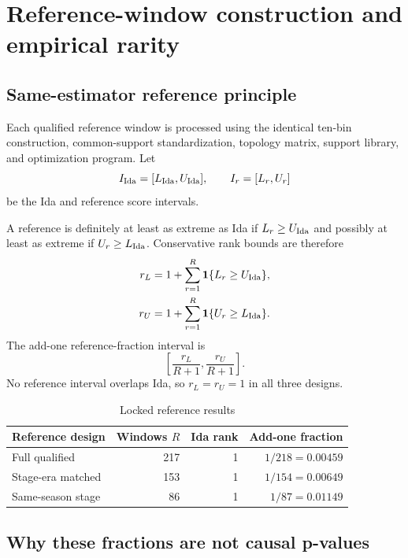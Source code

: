 \documentclass[11pt]{article}
\begin{document}
\section{Reference-window construction and empirical rarity}
\label{sec:reference}

\subsection{Same-estimator reference principle}

Each qualified reference window is processed using the identical ten-bin construction, common-support standardization, topology matrix, support library, and optimization program. Let
\begin{equation}
I_{\mathrm{Ida}}=[L_{\mathrm{Ida}},U_{\mathrm{Ida}}],
\qquad
I_r=[L_r,U_r]
\end{equation}
be the Ida and reference score intervals.

A reference is definitely at least as extreme as Ida if $L_r\ge U_{\mathrm{Ida}}$ and possibly at least as extreme if $U_r\ge L_{\mathrm{Ida}}$. Conservative rank bounds are therefore
\begin{align}
r_L&=1+\sum_{r=1}^{R}\mathbf{1}\{L_r\ge U_{\mathrm{Ida}}\},\\
r_U&=1+\sum_{r=1}^{R}\mathbf{1}\{U_r\ge L_{\mathrm{Ida}}\}.
\label{eq:rankbounds}
\end{align}
The add-one reference-fraction interval is
\begin{equation}
\left[\frac{r_L}{R+1},\frac{r_U}{R+1}\right].
\label{eq:addone}
\end{equation}
No reference interval overlaps Ida, so $r_L=r_U=1$ in all three designs.

\begin{table}[H]
\centering
\caption{Locked reference results}
\label{tab:reference}
\begin{tabular}{@{}lrrr@{}}
\toprule
Reference design & Windows $R$ & Ida rank & Add-one fraction \\
\midrule
Full qualified & 217 & 1 & $1/218=0.00459$ \\
Stage-era matched & 153 & 1 & $1/154=0.00649$ \\
Same-season stage & 86 & 1 & $1/87=0.01149$ \\
\bottomrule
\end{tabular}
\end{table}

\subsection{Why these fractions are not causal p-values}
\end{document}
